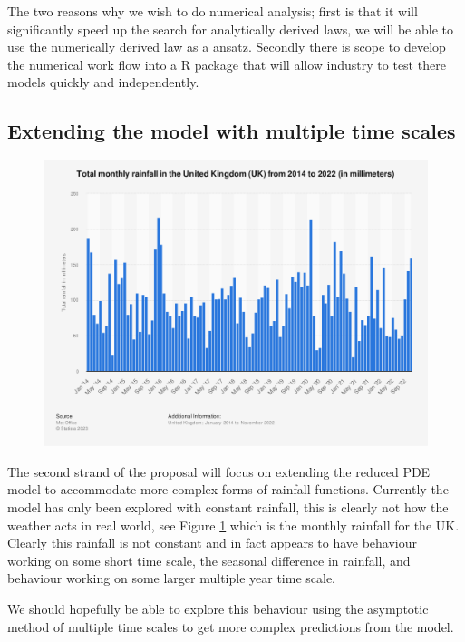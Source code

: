 \documentclass[11pt]{article}
\begin{document}
\vspace{5pt}

\qquad The two reasons why we wish to do numerical analysis; first is that it will significantly speed up the search for analytically derived laws, we will be able to use the numerically derived law as a ansatz. Secondly there is scope to develop the numerical work flow into a R package that will allow industry to test there models quickly and independently.



\subsection{Extending the model with multiple time scales}

\begin{minipage}{0.45\textwidth}
    \begin{figure}[H]
    \centering
    \includegraphics[width=\textwidth]{Figs/Rainfall.png}
    \label{fig:rainfall}
    \end{figure}
\end{minipage}
\hspace{0.05\textwidth}
\indent\begin{minipage}{0.45\textwidth}
    The second strand of the proposal will focus on extending the reduced PDE model to accommodate more complex forms of rainfall functions. Currently the model has only been explored with constant rainfall, this is clearly not how the weather acts in real world, see Figure \ref{fig:rainfall} which is the monthly rainfall for the UK. 
    Clearly this rainfall is not constant and in fact appears to have behaviour working on some short time scale, the seasonal difference in rainfall, and behaviour working on some larger multiple year time scale.

    \qquad We should hopefully be able to explore this behaviour using the asymptotic method of multiple time scales to get more complex predictions from the model.
\end{minipage}
\end{document}

